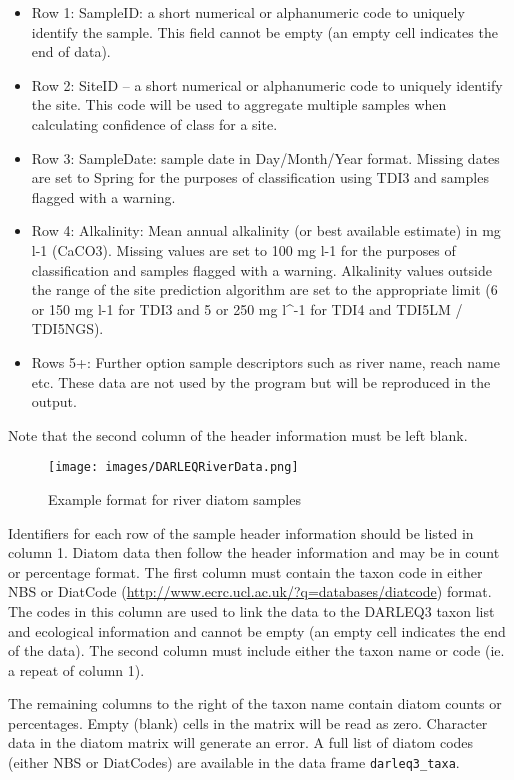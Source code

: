 \documentclass[]{article}
\begin{document}
\begin{itemize}
\item
  Row 1: SampleID: a short numerical or alphanumeric code to uniquely
  identify the sample. This field cannot be empty (an empty cell
  indicates the end of data).
\item
  Row 2: SiteID -- a short numerical or alphanumeric code to uniquely
  identify the site. This code will be used to aggregate multiple
  samples when calculating confidence of class for a site.
\item
  Row 3: SampleDate: sample date in Day/Month/Year format. Missing dates
  are set to Spring for the purposes of classification using TDI3 and
  samples flagged with a warning.
\item
  Row 4: Alkalinity: Mean annual alkalinity (or best available estimate)
  in mg l-1 (CaCO3). Missing values are set to 100 mg l-1 for the
  purposes of classification and samples flagged with a warning.
  Alkalinity values outside the range of the site prediction algorithm
  are set to the appropriate limit (6 or 150 mg l-1 for TDI3 and 5 or
  250 mg l\^{}-1 for TDI4 and TDI5LM / TDI5NGS).
\item
  Rows 5+: Further option sample descriptors such as river name, reach
  name etc. These data are not used by the program but will be
  reproduced in the output.
\end{itemize}

Note that the second column of the header information must be left
blank.

\begin{figure}
\centering
\texttt{[image: images/DARLEQRiverData.png]}
\caption{Example format for river diatom samples}
\end{figure}

Identifiers for each row of the sample header information should be
listed in column 1. Diatom data then follow the header information and
may be in count or percentage format. The first column must contain the
taxon code in either NBS or DiatCode
(\url{http://www.ecrc.ucl.ac.uk/?q=databases/diatcode}) format. The
codes in this column are used to link the data to the DARLEQ3 taxon list
and ecological information and cannot be empty (an empty cell indicates
the end of the data). The second column must include either the taxon
name or code (ie. a repeat of column 1).

The remaining columns to the right of the taxon name contain diatom
counts or percentages. Empty (blank) cells in the matrix will be read as
zero. Character data in the diatom matrix will generate an error. A full
list of diatom codes (either NBS or DiatCodes) are available in the data
frame \texttt{darleq3\_taxa}.
\end{document}
